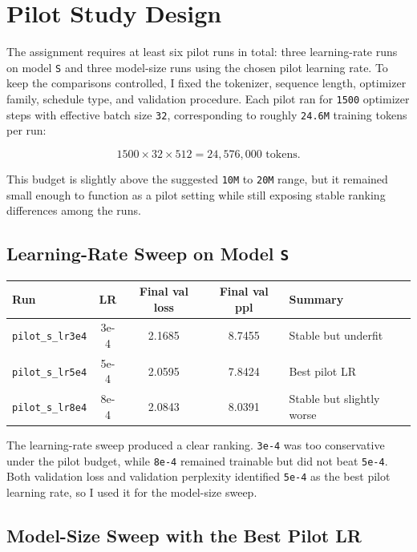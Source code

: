\documentclass[11pt]{article}
\begin{document}
\section{Pilot Study Design}

The assignment requires at least six pilot runs in total: three learning-rate runs on model \texttt{S} and three model-size runs using the chosen pilot learning rate. To keep the comparisons controlled, I fixed the tokenizer, sequence length, optimizer family, schedule type, and validation procedure. Each pilot ran for \texttt{1500} optimizer steps with effective batch size \texttt{32}, corresponding to roughly \texttt{24.6M} training tokens per run:

\[
1500 \times 32 \times 512 = 24{,}576{,}000 \text{ tokens.}
\]

This budget is slightly above the suggested \texttt{10M} to \texttt{20M} range, but it remained small enough to function as a pilot setting while still exposing stable ranking differences among the runs.

\subsection{Learning-Rate Sweep on Model \texttt{S}}

\begin{table}[H]
\centering
\small
\begin{tabular}{lcccl}
\toprule
Run & LR & Final val loss & Final val ppl & Summary \\
\midrule
\texttt{pilot\_s\_lr3e4} & 3e-4 & 2.1685 & 8.7455 & Stable but underfit \\
\texttt{pilot\_s\_lr5e4} & 5e-4 & 2.0595 & 7.8424 & Best pilot LR \\
\texttt{pilot\_s\_lr8e4} & 8e-4 & 2.0843 & 8.0391 & Stable but slightly worse \\
\bottomrule
\end{tabular}
\end{table}

The learning-rate sweep produced a clear ranking. \texttt{3e-4} was too conservative under the pilot budget, while \texttt{8e-4} remained trainable but did not beat \texttt{5e-4}. Both validation loss and validation perplexity identified \texttt{5e-4} as the best pilot learning rate, so I used it for the model-size sweep.

\subsection{Model-Size Sweep with the Best Pilot LR}
\end{document}
